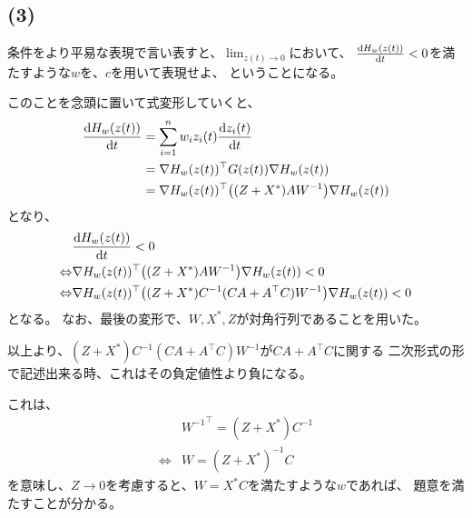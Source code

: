 \documentclass[a4paper, 10pt, dvipdfmx]{jlreq}
\begin{document}
\subsection*{(3)}

条件をより平易な表現で言い表すと、$\lim_{z(t) \to 0}$において、
$\dv{H_w(z(t))}{t}<0$を満たすような$w$を、$c$を用いて表現せよ、
ということになる。

このことを念頭に置いて式変形していくと、
\begin{align*}
  \dv{H_w(z(t))}{t} & =\sum_{i=1}^{n}{w_i z_i(t)\dv{z_i(t)}{t}}                   \\
                    & =\nabla H_w(z(t))^\top G(z(t))\nabla H_w(z(t))              \\
                    & =\nabla H_w(z(t))^\top \qty((Z+X^*)AW^{-1})\nabla H_w(z(t))
\end{align*}
となり、
\begin{align*}
                  & \dv{H_w(z(t))}{t}<0                                                            \\
  \Leftrightarrow & \nabla H_w(z(t))^\top \qty((Z+X^*)AW^{-1})\nabla H_w(z(t))<0                   \\
  \Leftrightarrow & \nabla H_w(z(t))^\top \qty((Z+X^*)C^{-1}(CA+A^\top C)W^{-1})\nabla H_w(z(t))<0
\end{align*}
となる。
なお、最後の変形で、$W,X^*,Z$が対角行列であることを用いた。

以上より、$(Z+X^*)C^{-1}(CA+A^\top C)W^{-1}$が$CA+A^\top C$に関する
二次形式の形で記述出来る時、これはその負定値性より負になる。

これは、
\begin{align*}
                  & {W^{-1}}^\top =(Z+X^*)C^{-1} \\
  \Leftrightarrow & W=(Z+X^*)^{-1}C
\end{align*}
を意味し、$Z \to 0$を考慮すると、$W=X^*C$を満たすような$w$であれば、
題意を満たすことが分かる。
\end{document}
